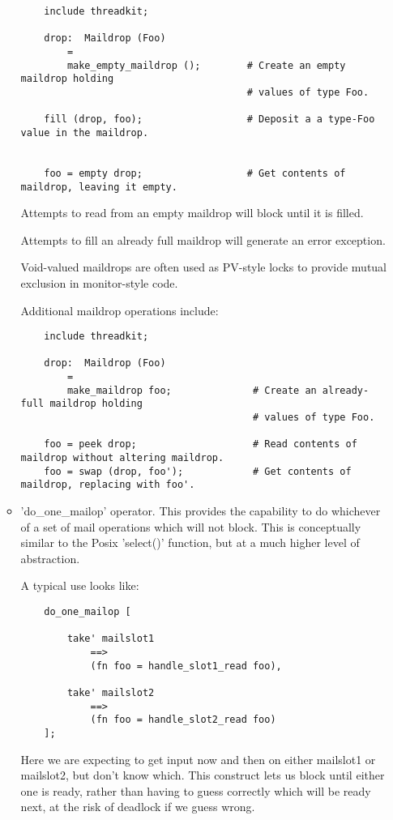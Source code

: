 \begin{itemize}
\begin{itemize}
\begin{verbatim}
    include threadkit;

    drop:  Maildrop (Foo)
        =
        make_empty_maildrop ();        # Create an empty maildrop holding
                                       # values of type Foo.

    fill (drop, foo);                  # Deposit a a type-Foo value in the maildrop.


    foo = empty drop;                  # Get contents of maildrop, leaving it empty.
\end{verbatim}

Attempts to read from an empty maildrop will 
block until it is filled.

Attempts to fill an already full maildrop 
will generate an error exception.

Void-valued maildrops are often used as 
PV-style locks to provide mutual exclusion 
in monitor-style code.

Additional maildrop operations include:

\begin{verbatim}
    include threadkit;

    drop:  Maildrop (Foo)
        =
        make_maildrop foo;              # Create an already-full maildrop holding
                                        # values of type Foo.

    foo = peek drop;                    # Read contents of maildrop without altering maildrop.
    foo = swap (drop, foo');            # Get contents of maildrop, replacing with foo'.
\end{verbatim}

\item 
'do\_one\_mailop' operator.  This provides the 
capability to do whichever of a set of 
mail operations which will not block. 
This is conceptually similar to the Posix 
'select()' function, but at a much higher 
level of abstraction.

A typical use looks like:

\begin{verbatim}
    do_one_mailop [

        take' mailslot1
            ==>
            (fn foo = handle_slot1_read foo),

        take' mailslot2
            ==>
            (fn foo = handle_slot2_read foo)
    ];
\end{verbatim}

Here we are expecting to get input now and 
then on either mailslot1 or mailslot2, but 
don't know which.  This construct lets us 
block until either one is ready, rather than 
having to guess correctly which will be ready 
next, at the risk of deadlock if we guess wrong. 


\end{itemize}
\end{itemize}
